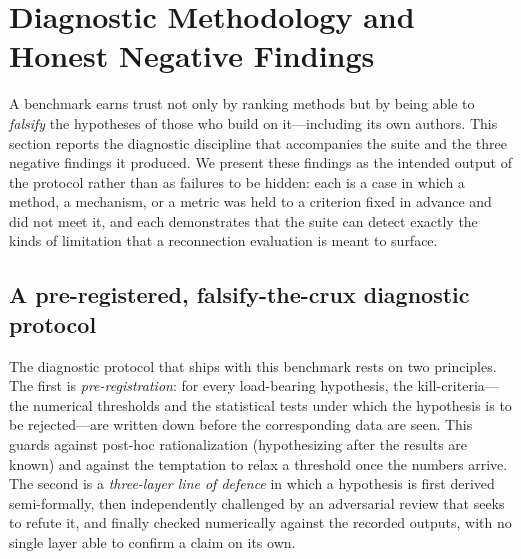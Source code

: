 \section{Diagnostic Methodology and Honest Negative Findings}
\label{sec:diagnostics}

A benchmark earns trust not only by ranking methods but by being able to
\emph{falsify} the hypotheses of those who build on it---including its own
authors. This section reports the diagnostic discipline that accompanies the
suite and the three negative findings it produced. We present these findings
as the intended output of the protocol rather than as failures to be hidden:
each is a case in which a method, a mechanism, or a metric was held to a
criterion fixed in advance and did not meet it, and each demonstrates that
the suite can detect exactly the kinds of limitation that a reconnection
evaluation is meant to surface.

\subsection{A pre-registered, falsify-the-crux diagnostic protocol}
\label{sec:diagnostics:protocol}

The diagnostic protocol that ships with this benchmark rests on two
principles. The first is \emph{pre-registration}: for every load-bearing
hypothesis, the kill-criteria---the numerical thresholds and the statistical
tests under which the hypothesis is to be rejected---are written down before
the corresponding data are seen. This guards against post-hoc rationalization
(hypothesizing after the results are known) and against the temptation to
relax a threshold once the numbers arrive. The second is a
\emph{three-layer line of defence} in which a hypothesis is first derived
semi-formally, then independently challenged by an adversarial review that
seeks to refute it, and finally checked numerically against the recorded
outputs, with no single layer able to confirm a claim on its own.

